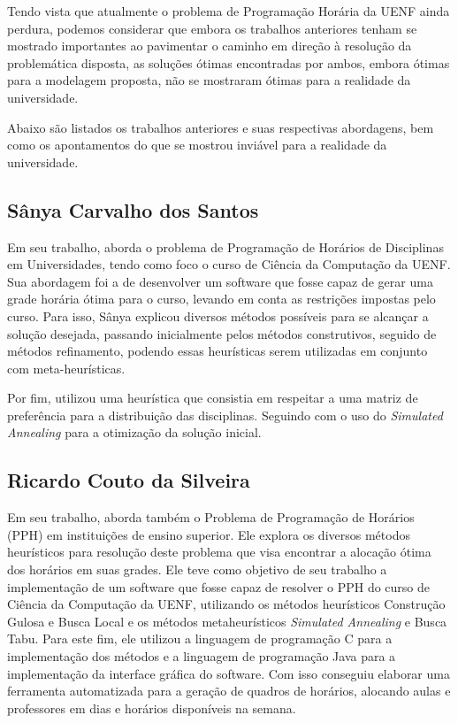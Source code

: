 Tendo vista que atualmente o problema de Programação Horária da UENF ainda perdura, podemos considerar que embora os trabalhos anteriores tenham se mostrado importantes ao pavimentar o caminho em direção à resolução da problemática disposta, as soluções ótimas encontradas por ambos, embora ótimas para a modelagem proposta, não se mostraram ótimas para a realidade da universidade.

Abaixo são listados os trabalhos anteriores e suas respectivas abordagens, bem como os apontamentos do que se mostrou inviável para a realidade da universidade.

\subsection{Sânya Carvalho dos Santos} %

Em seu trabalho,  aborda o problema de Programação de Horários de Disciplinas em Universidades, tendo como foco o curso de Ciência da Computação da UENF. Sua abordagem foi a de desenvolver um software que fosse capaz de gerar uma grade horária ótima para o curso, levando em conta as restrições impostas pelo curso. Para isso, Sânya explicou diversos métodos possíveis para se alcançar a solução desejada, passando inicialmente pelos métodos construtivos, seguido de métodos refinamento, podendo essas heurísticas serem utilizadas em conjunto com meta-heurísticas.

Por fim, utilizou uma heurística que consistia em respeitar a uma matriz de preferência para a distribuição das disciplinas. Seguindo com o uso do \textit{Simulated Annealing} para a otimização da solução inicial.

\subsection{Ricardo Couto da Silveira} %

Em seu trabalho,  aborda também o Problema de Programação de Horários (PPH) em instituições de ensino superior. Ele explora os diversos métodos heurísticos para resolução deste problema que visa encontrar a alocação ótima dos horários em suas grades. Ele teve como objetivo de seu trabalho a implementação de um software que fosse capaz de resolver o PPH do curso de Ciência da Computação da UENF, utilizando os métodos heurísticos Construção Gulosa e Busca Local e os métodos metaheurísticos \textit{Simulated Annealing} e Busca Tabu. Para este fim, ele utilizou a linguagem de programação C para a implementação dos métodos e a linguagem de programação Java para a implementação da interface gráfica do software. Com isso conseguiu elaborar uma ferramenta automatizada para a geração de quadros de horários, alocando aulas e professores em dias e horários disponíveis na semana.

